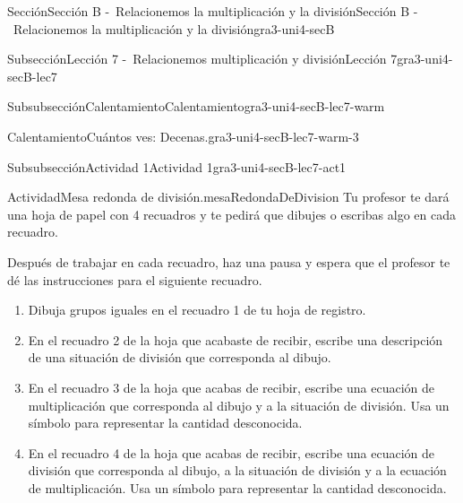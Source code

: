 \documentclass[twoside,10pt,]{article}
\begin{document}
\begin{sectionptx}{Sección}{Sección B -~Relacionemos la multiplicación y la división}{}{Sección B -~Relacionemos la multiplicación y la división}{}{}{gra3-uni4-secB}
\begin{subsectionptx}{Subsección}{Lección 7 -~Relacionemos multiplicación y división}{}{Lección 7}{}{}{gra3-uni4-secB-lec7}
\begin{subsubsectionptx}{Subsubsección}{Calentamiento}{}{Calentamiento}{}{}{gra3-uni4-secB-lec7-warm}
\begin{exploration}{Calentamiento}{Cuántos ves: Decenas.}{gra3-uni4-secB-lec7-warm-3}
\begin{image}{0}{1}{0}{}
\end{image}%
\end{exploration}%
\end{subsubsectionptx}
%
%
\typeout{************************************************}
\typeout{************************************************}
%
\begin{subsubsectionptx}{Subsubsección}{Actividad 1}{}{Actividad 1}{}{}{gra3-uni4-secB-lec7-act1}
\begin{activity}{Actividad}{Mesa redonda de división.}{mesaRedondaDeDivision}%
Tu profesor te dará una hoja de papel con 4 recuadros y te pedirá que dibujes o escribas algo en cada recuadro.%
\par
Después de trabajar en cada recuadro, haz una pausa y espera que el profesor te dé las instrucciones para el siguiente recuadro.%
%
\begin{enumerate}
\item{}Dibuja grupos iguales en el recuadro 1 de tu hoja de registro.%
\item{}En el recuadro 2 de la hoja que acabaste de recibir, escribe una descripción de una situación de división que corresponda al dibujo.%
\item{}En el recuadro 3 de la hoja que acabas de recibir, escribe una ecuación de multiplicación que corresponda al dibujo y a la situación de división. Usa un símbolo para representar la cantidad desconocida.%
\item{}En el recuadro 4 de la hoja que acabas de recibir, escribe una ecuación de división que corresponda al dibujo, a la situación de división y a la ecuación de multiplicación. Usa un símbolo para representar la cantidad desconocida.%
\end{enumerate}
\begin{image}{0.2}{0.6}{0.2}{}%

\end{image}
\end{activity}
\end{subsubsectionptx}
\end{subsectionptx}
\end{sectionptx}
\end{document}
